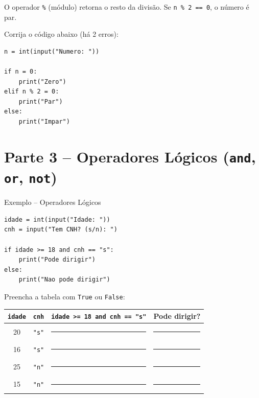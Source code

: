 \documentclass[12pt]{article}
\begin{document}
\begin{dicabox}
O operador \texttt{\%} (módulo) retorna o resto da divisão. Se \texttt{n \% 2 == 0}, o número é par.
\end{dicabox}

\begin{fixacaobox}
Corrija o código abaixo (há 2 erros):
\begin{lstlisting}
n = int(input("Numero: "))

if n = 0:
    print("Zero")
elif n % 2 = 0:
    print("Par")
else:
    print("Impar")
\end{lstlisting}
\end{fixacaobox}

\section*{Parte 3 -- Operadores Lógicos (\texttt{and}, \texttt{or}, \texttt{not})}

\begin{exemplobox}{Exemplo -- Operadores Lógicos}
\begin{lstlisting}
idade = int(input("Idade: "))
cnh = input("Tem CNH? (s/n): ")

if idade >= 18 and cnh == "s":
    print("Pode dirigir")
else:
    print("Nao pode dirigir")
\end{lstlisting}
\end{exemplobox}

\begin{fixacaobox}
Preencha a tabela com \texttt{True} ou \texttt{False}:
\begin{center}
\begin{tabular}{|c|c|c|c|}
\hline
\texttt{idade} & \texttt{cnh} & \texttt{idade >= 18 and cnh == "s"} & Pode dirigir? \\
\hline
20 & \texttt{"s"} & \rule{2cm}{0.4pt} & \rule{2cm}{0.4pt} \\
\hline
16 & \texttt{"s"} & \rule{2cm}{0.4pt} & \rule{2cm}{0.4pt} \\
\hline
25 & \texttt{"n"} & \rule{2cm}{0.4pt} & \rule{2cm}{0.4pt} \\
\hline
15 & \texttt{"n"} & \rule{2cm}{0.4pt} & \rule{2cm}{0.4pt} \\
\hline
\end{tabular}
\end{center}
\end{fixacaobox}
\end{document}
